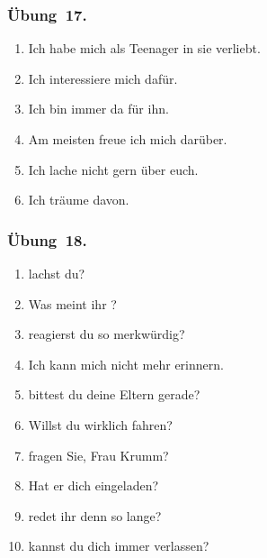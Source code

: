 \subsubsection*{Übung~17.}
\begin{enumerate}
    \item Ich habe mich als Teenager in sie verliebt.
    \item Ich interessiere mich dafür.
    \item Ich bin immer da für ihn.
    \item Am meisten freue ich mich darüber.
    \item Ich lache nicht gern über euch.
    \item Ich träume davon.
\end{enumerate}
\subsubsection*{Übung~18.}
\begin{enumerate}
    \item {} lachst du?
    \item Was meint ihr ?
    \item {} reagierst du so merkwürdig?
    \item Ich kann mich  nicht mehr erinnern.
    \item {} bittest du deine Eltern gerade?
    \item Willst du  wirklich fahren?
    \item {} fragen Sie, Frau Krumm?
    \item Hat er dich  eingeladen?
    \item {} redet ihr denn so lange?
    \item {} kannst du dich immer verlassen?
\end{enumerate}